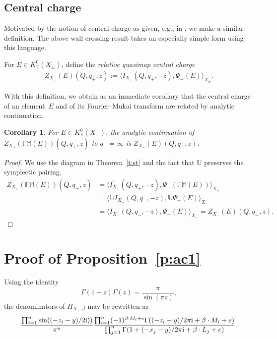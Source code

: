 \documentclass[pdftex]{sigma}
\newtheorem{Corollary}[Theorem]{Corollary}
\numberwithin{equation}{section}
\newcommand{\UU}{\mathbb{U}}
\newcommand{\torus}{\mathbb{T}}
\newcommand{\FM}{\mathbb{FM}}
\newcommand{\MB}{M}
\newcommand{\LB}{L}
\newcommand{\z}{z}
\newcommand{\x}{x}
\newcommand{\y}{y}
\begin{document}
\subsection{Central charge}

Motivated by the notion of central charge as given, e.g., in \cite{AL, IriInt}, we make a similar definition. The above wall crossing result takes an especially simple form using this language.
\begin{Definition}

For $E \in K^0_\torus(X_\pm)$, define the \emph{relative quasimap central charge}
\begin{align*}
Z_{X_\pm}(E)(Q, q_\pm, z) := \langle I_{X_{\pm}}(Q, q_\pm, -z), \Psi_\pm(E)\rangle_{X_\pm}.
\end{align*}
\end{Definition}

With this definition, we obtain as an immediate corollary that the central charge of an element~$E$ and of its Fourier--Mukai transform are related by analytic continuation.
\begin{Corollary}
For $E \in K^0_\torus(X_-)$, the analytic continuation of $Z_{X_+}(\FM(E))(Q, q_+, z)$ to ${q_+\! =\! \infty}$ is $Z_{X_-}(E)(Q, q_-, z)$.
\end{Corollary}
\begin{proof}
We use the diagram in Theorem~\ref{t:st} and the fact that $\UU$ preserves the symplectic pairing,
\begin{align*}
\widetilde{Z_{X_+}}(\FM(E))(Q, q_+, z)& =\bigl\langle \widetilde{I_{X_{+}}}(Q, q_+, -z), \Psi_+(\FM(E))\bigr\rangle_{X_+} \\
& = \langle \UU I_{X_{-}}(Q, q_-, -z), \UU \Psi_-(E)\rangle_{X_+}\\
& = \langle I_{X_{-}}(Q, q_-, -z), \Psi_-(E)\rangle_{X_-}
= Z_{X_-}(E)(Q, q_-, z).
\tag*{\qed}
\end{align*}
\renewcommand{\qed}{}
\end{proof}


\appendix
\section{Proof of Proposition~\ref{p:ac1}}\label{appendix}

Using the identity
\begin{equation}\label{e:Gamma}\Gamma(1-z) \Gamma(z) = \frac{\pi}{\sin(\pi z)},\end{equation}
 the denominators of $H_{X_{+}, \beta}$ may be rewritten as
\[
\frac{ \prod_{i=1}^n \sin( (-\z_i -\y)/2 {\rm i}) )}{\pi^n}
\frac{\prod_{i=1}^n (-1)^{\beta \cdot \MB_i + e}\Gamma((-\z_i - \y)/2 \pi {\rm i} + \beta \cdot \MB_i + e)}
{\prod_{j=1}^n \Gamma(1 + (- \x_j - \y)/2 \pi {\rm i} + \beta \cdot \LB_j+e) }.
\]
\end{document}
